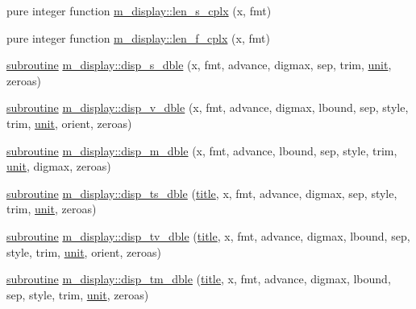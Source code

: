 \begin{DoxyCompactItemize}
\item 
pure integer function \hyperlink{namespacem__display_a7b573fb0cba7c7c954a820cdfe1c7968}{m\+\_\+display\+::len\+\_\+s\+\_\+cplx} (x, fmt)
\item 
pure integer function \hyperlink{namespacem__display_a37f268a7276f14d4975200a8f83acff3}{m\+\_\+display\+::len\+\_\+f\+\_\+cplx} (x, fmt)
\item 
\hyperlink{M__stopwatch_83_8txt_acfbcff50169d691ff02d4a123ed70482}{subroutine} \hyperlink{namespacem__display_a8462e9d78a29a0658777c7af9eabd28c}{m\+\_\+display\+::disp\+\_\+s\+\_\+dble} (x, fmt, advance, digmax, sep, trim, \hyperlink{M__stopwatch_83_8txt_a5cbef30eb7c0d734bd82f5a7ebea9aa7}{unit}, zeroas)
\item 
\hyperlink{M__stopwatch_83_8txt_acfbcff50169d691ff02d4a123ed70482}{subroutine} \hyperlink{namespacem__display_ab4f1149ffdc3afbc851bfc62ce4a55aa}{m\+\_\+display\+::disp\+\_\+v\+\_\+dble} (x, fmt, advance, digmax, lbound, sep, style, trim, \hyperlink{M__stopwatch_83_8txt_a5cbef30eb7c0d734bd82f5a7ebea9aa7}{unit}, orient, zeroas)
\item 
\hyperlink{M__stopwatch_83_8txt_acfbcff50169d691ff02d4a123ed70482}{subroutine} \hyperlink{namespacem__display_a0654623dfa7d590274102bc029c96a8f}{m\+\_\+display\+::disp\+\_\+m\+\_\+dble} (x, fmt, advance, lbound, sep, style, trim, \hyperlink{M__stopwatch_83_8txt_a5cbef30eb7c0d734bd82f5a7ebea9aa7}{unit}, digmax, zeroas)
\item 
\hyperlink{M__stopwatch_83_8txt_acfbcff50169d691ff02d4a123ed70482}{subroutine} \hyperlink{namespacem__display_ae661abeb19eae92ba50504a58d7c8c26}{m\+\_\+display\+::disp\+\_\+ts\+\_\+dble} (\hyperlink{print__watch_83_8txt_a15b5bd21156bb9fca6a755ab8c029a9c}{title}, x, fmt, advance, digmax, sep, style, trim, \hyperlink{M__stopwatch_83_8txt_a5cbef30eb7c0d734bd82f5a7ebea9aa7}{unit}, zeroas)
\item 
\hyperlink{M__stopwatch_83_8txt_acfbcff50169d691ff02d4a123ed70482}{subroutine} \hyperlink{namespacem__display_a0082afc2c20de6418d61567d807a070b}{m\+\_\+display\+::disp\+\_\+tv\+\_\+dble} (\hyperlink{print__watch_83_8txt_a15b5bd21156bb9fca6a755ab8c029a9c}{title}, x, fmt, advance, digmax, lbound, sep, style, trim, \hyperlink{M__stopwatch_83_8txt_a5cbef30eb7c0d734bd82f5a7ebea9aa7}{unit}, orient, zeroas)
\item 
\hyperlink{M__stopwatch_83_8txt_acfbcff50169d691ff02d4a123ed70482}{subroutine} \hyperlink{namespacem__display_a32a20b8679522732e464347be0e12808}{m\+\_\+display\+::disp\+\_\+tm\+\_\+dble} (\hyperlink{print__watch_83_8txt_a15b5bd21156bb9fca6a755ab8c029a9c}{title}, x, fmt, advance, digmax, lbound, sep, style, trim, \hyperlink{M__stopwatch_83_8txt_a5cbef30eb7c0d734bd82f5a7ebea9aa7}{unit}, zeroas)

\end{DoxyCompactItemize}
